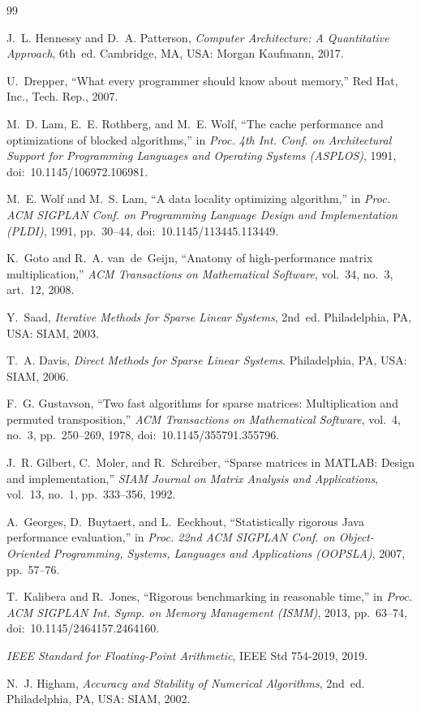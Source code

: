 \documentclass[conference,a4paper]{IEEEtran}
\begin{document}
\begingroup
\renewcommand{\section}[2]{}
\begin{thebibliography}{99}

J.~L. Hennessy and D.~A. Patterson, \emph{Computer Architecture: A Quantitative
Approach}, 6th~ed. Cambridge, MA, USA: Morgan Kaufmann, 2017.

U.~Drepper, ``What every programmer should know about memory,'' Red Hat, Inc.,
Tech. Rep., 2007.

M.~D. Lam, E.~E. Rothberg, and M.~E. Wolf, ``The cache performance and
optimizations of blocked algorithms,'' in \emph{Proc. 4th Int. Conf. on
Architectural Support for Programming Languages and Operating Systems
(ASPLOS)}, 1991, doi:~10.1145/106972.106981.

M.~E. Wolf and M.~S. Lam, ``A data locality optimizing algorithm,'' in
\emph{Proc. ACM SIGPLAN Conf. on Programming Language Design and
Implementation (PLDI)}, 1991, pp.~30--44, doi:~10.1145/113445.113449.

K.~Goto and R.~A. van~de~Geijn, ``Anatomy of high-performance matrix
multiplication,'' \emph{ACM Transactions on Mathematical Software}, vol.~34,
no.~3, art.~12, 2008.

Y.~Saad, \emph{Iterative Methods for Sparse Linear Systems}, 2nd~ed.
Philadelphia, PA, USA: SIAM, 2003.

T.~A. Davis, \emph{Direct Methods for Sparse Linear Systems}.
Philadelphia, PA, USA: SIAM, 2006.

F.~G. Gustavson, ``Two fast algorithms for sparse matrices: Multiplication and
permuted transposition,'' \emph{ACM Transactions on Mathematical Software},
vol.~4, no.~3, pp.~250--269, 1978, doi:~10.1145/355791.355796.

J.~R. Gilbert, C.~Moler, and R.~Schreiber, ``Sparse matrices in MATLAB: Design
and implementation,'' \emph{SIAM Journal on Matrix Analysis and Applications},
vol.~13, no.~1, pp.~333--356, 1992.

A.~Georges, D.~Buytaert, and L.~Eeckhout, ``Statistically rigorous Java
performance evaluation,'' in \emph{Proc. 22nd ACM SIGPLAN Conf. on
Object-Oriented Programming, Systems, Languages and Applications (OOPSLA)},
2007, pp.~57--76.

T.~Kalibera and R.~Jones, ``Rigorous benchmarking in reasonable time,'' in
\emph{Proc. ACM SIGPLAN Int. Symp. on Memory Management (ISMM)}, 2013,
pp.~63--74, doi:~10.1145/2464157.2464160.

\emph{IEEE Standard for Floating-Point Arithmetic}, IEEE Std 754-2019, 2019.

N.~J. Higham, \emph{Accuracy and Stability of Numerical Algorithms}, 2nd~ed.
Philadelphia, PA, USA: SIAM, 2002.

\end{thebibliography}
\end{document}
